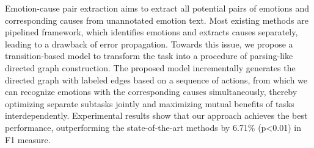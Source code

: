 Emotion-cause pair extraction aims to extract all potential pairs of emotions and corresponding causes from unannotated emotion text. Most existing methods are pipelined framework, which identifies emotions and extracts causes separately, leading to a drawback of error propagation. Towards this issue, we propose a transition-based model to transform the task into a procedure of parsing-like directed graph construction. The proposed model incrementally generates the directed graph with labeled edges based on a sequence of actions, from which we can recognize emotions with the corresponding causes simultaneously, thereby optimizing separate subtasks jointly and maximizing mutual benefits of tasks interdependently. Experimental results show that our approach achieves the best performance, outperforming the state-of-the-art methods by 6.71\% (p<0.01) in F1 measure.

